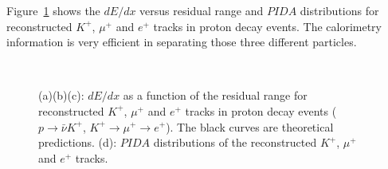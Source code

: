 Figure~\ref{dedx} shows the $dE/dx$ versus residual range and $PIDA$ distributions for reconstructed $K^{+}$, $\mu^{+}$ and $e^{+}$ tracks in proton decay events. The calorimetry information is very efficient in separating those three different particles.

\begin{figure}[!ht]
\\
\caption{(a)(b)(c): $dE/dx$ as a function of the residual range for reconstructed $K^{+}$, $\mu^{+}$ and $e^{+}$ tracks in proton decay events ($p\rightarrow\bar{\nu}K^{+}$, $K^{+}\rightarrow\mu^{+}\rightarrow e^{+}$). The black curves are theoretical predictions. (d): $PIDA$ distributions of the reconstructed $K^{+}$, $\mu^{+}$ and $e^{+}$ tracks.}
\label{dedx}
\end{figure}


